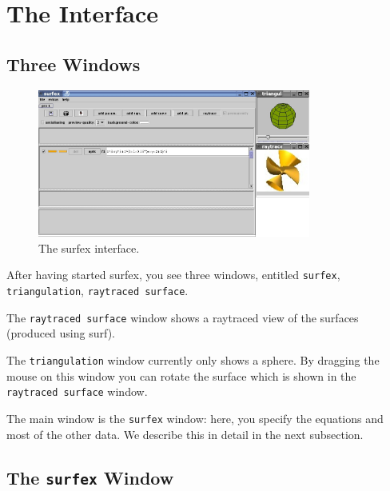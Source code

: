 \documentclass{article}
\newcommand{\surfex}{{\sc surfex}}
\begin{document}
\section{The Interface}


%
\subsection{Three Windows}

\begin{figure}[htbp]
  \begin{center}
    \includegraphics[width=0.8\textwidth]{surfex_simple}
    \caption{The \surfex{} interface.}
    \label{fig:surfex_simple}
  \end{center}
\end{figure}

After having started \surfex, you see three windows, entitled {\tt surfex}, {\tt
  triangulation}, {\tt raytraced surface}.

The {\tt raytraced surface} window shows a raytraced view of the surfaces
(produced using {\sc surf}).

The {\tt triangulation} window currently only shows a sphere.
By dragging the mouse on this window you can rotate the surface which is
shown in the {\tt raytraced surface} window.

The main window is the {\tt surfex} window:
here, you specify the equations and most of the other data.
We describe this in detail in the next subsection.



%
\subsection{The {\tt surfex} Window}
\end{document}
